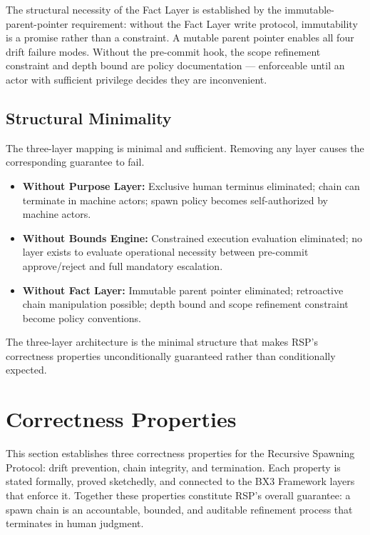 The structural necessity of the Fact Layer is established by the immutable-parent-pointer requirement: without the Fact Layer write protocol, immutability is a promise rather than a constraint. A mutable parent pointer enables all four drift failure modes. Without the pre-commit hook, the scope refinement constraint and depth bound are policy documentation — enforceable until an actor with sufficient privilege decides they are inconvenient.

\subsection{Structural Minimality}
\label{sec:rs-minimality}

The three-layer mapping is minimal and sufficient. Removing any layer causes the corresponding guarantee to fail.

\begin{itemize}
\item \textbf{Without Purpose Layer:} Exclusive human terminus eliminated; chain can terminate in machine actors; spawn policy becomes self-authorized by machine actors.
\item \textbf{Without Bounds Engine:} Constrained execution evaluation eliminated; no layer exists to evaluate operational necessity between pre-commit approve/reject and full mandatory escalation.
\item \textbf{Without Fact Layer:} Immutable parent pointer eliminated; retroactive chain manipulation possible; depth bound and scope refinement constraint become policy conventions.
\end{itemize}

The three-layer architecture is the minimal structure that makes RSP's correctness properties unconditionally guaranteed rather than conditionally expected.

\section{Correctness Properties}
\label{sec:rs-correctness}

This section establishes three correctness properties for the Recursive Spawning Protocol: drift prevention, chain integrity, and termination. Each property is stated formally, proved sketchedly, and connected to the BX3 Framework layers that enforce it. Together these properties constitute RSP's overall guarantee: a spawn chain is an accountable, bounded, and auditable refinement process that terminates in human judgment.

